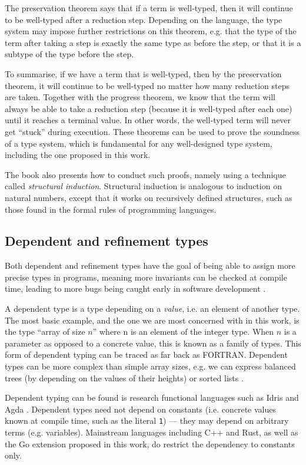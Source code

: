 The preservation theorem says that if a term is well-typed, then it will
continue to be well-typed after a reduction step. Depending on the language,
the type system may impose further restrictions on this theorem, e.g. that
the type of the term after taking a step is exactly the same type as before
the step, or that it is a subtype of the type before the step.

To summarise, if we have a term that is well-typed, then by the preservation
theorem, it will continue to be well-typed no matter how many reduction steps
are taken. Together with the progress theorem, we know that the term will always
be able to take a reduction step (because it is well-typed after each one) until
it reaches a terminal value. In other words, the well-typed term will never get
``stuck'' during execution. These theorems can be used to prove the soundness of
a type system, which is fundamental for any well-designed type system, including
the one proposed in this work.

The book also presents how to conduct such proofs, namely using a technique
called \emph{structural induction}. Structural induction is analogous to
induction on natural numbers, except that it works on recursively defined
structures, such as those found in the formal rules of programming languages.

\subsection{Dependent and refinement types}

Both dependent and refinement types have the goal of being able to assign more
precise types in programs, meaning more invariants can be checked at compile
time, leading to more bugs being caught early in software development
\autocites{dependentPractical}{refinement}.

A dependent type is a type depending on a \emph{value}, i.e. an element of
another type. The most basic example, and the one we are most concerned with in
this work, is the type ``array of size $n$'' where n is an element of the
integer type. When $n$ is a parameter as opposed to a concrete value, this is
known as a family of types. This form of dependent typing can be traced as far
back as FORTRAN. Dependent types can be more complex than simple array sizes,
e.g. we can express balanced trees (by depending on the values of their heights)
or sorted lists \autocite{dependentAtWork}.

Dependent typing can be found is research functional languages such as Idris and
Agda \autocites{idris}{agda}. Dependent types need not depend on constants (i.e.
concrete values known at compile time, such as the literal \texttt{1}) --- they
may depend on arbitrary terms (e.g. variables). Mainstream languages including
C++ and Rust, as well as the Go extension proposed in this work, do restrict the
dependency to constants only.

